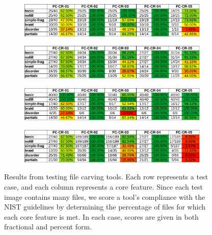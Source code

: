 \begin{figure}
    \centering

    \begin{subfigure}{\linewidth}
        \includegraphics[width=\linewidth]{fig/foremost_results_carve.pdf}
    \end{subfigure}
    \begin{subfigure}{\linewidth}
        \includegraphics[width=\linewidth]{fig/axiom_results_carve.pdf}
    \end{subfigure}
    \begin{subfigure}{\linewidth}
        \includegraphics[width=\linewidth]{fig/photorec_results_carve.pdf}
    \end{subfigure}
    \begin{subfigure}{\linewidth}
        \includegraphics[width=\linewidth]{fig/scalpel_results_carve.pdf}
    \end{subfigure}
        
    \caption{
    Results from testing file carving tools. 
    Each row represents a test case, and each column represents a core feature. 
    Since each test image contains many files, we score a tool's compliance with the NIST guidelines by determining the percentage of files for which each core feature is met.
    In each case, scores are given in both fractional and percent form.
    }
    \label{fig:results_carve}
\end{figure}

